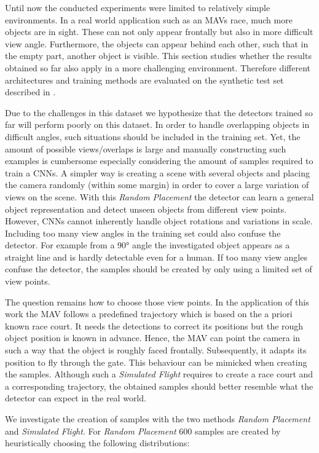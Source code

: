 Until now the conducted experiments were limited to relatively simple environments. In a real world application such as an \acp{MAV} race, much more objects are in sight. These can not only appear frontally but also in more difficult view angle. Furthermore, the objects can appear behind each other, such that in the empty part, another object is visible. This section studies whether the results obtained so far also apply in a more challenging environment. Therefore different architectures and training methods are evaluated on the synthetic test set described in .

Due to the challenges in this dataset we hypothesize that the detectors trained so far will perform poorly on this dataset. In order to handle overlapping objects in difficult angles, such situations should be included in the training set. Yet, the amount of possible views/overlaps is large and manually constructing such examples is cumbersome especially considering the amount of samples required to train a \acp{CNN}. A simpler way is creating a scene with several objects and placing the camera randomly (within some margin) in order to cover a large variation of views on the scene. With this \textit{Random Placement} the detector can learn a general object representation and detect unseen objects from different view points. However, \acp{CNN} cannot inherently handle object rotations and variations in scale. Including too many view angles in the training set could also confuse the detector. For example from a 90° angle the investigated object appears as a straight line and is hardly detectable even for a human. If too many view angles confuse the detector, the samples should be created by only using a limited set of view points.

The question remains how to choose those view points. In the application of this work the \ac{MAV} follows a predefined trajectory which is based on the a priori known race court. It needs the detections to correct its positions but the rough object position is known in advance.
Hence, the \ac{MAV} can point the camera in such a way that the object is roughly faced frontally. Subsequently, it adapts its position to fly through the gate. This behaviour can be mimicked when creating the samples. Although such a \textit{Simulated Flight} requires to create a race court and a corresponding trajectory, the obtained samples should better resemble what the detector can expect in the real world.

We investigate the creation of samples with the two methods \textit{Random Placement} and \textit{Simulated Flight}. For \textit{Random Placement} 600 samples are created by heuristically choosing the following distributions:

